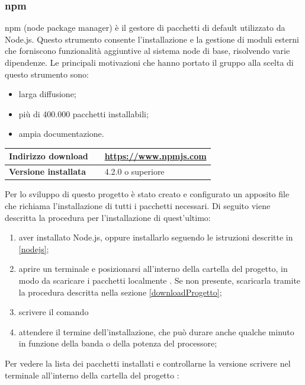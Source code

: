 		\subsubsection{npm} \label{npm}
		npm (node package manager) è il gestore di pacchetti di default utilizzato da Node.js. Questo strumento consente  l'installazione e la gestione di moduli esterni che forniscono funzionalità aggiuntive al sistema node di base, risolvendo varie dipendenze.
		Le principali motivazioni che hanno portato il gruppo alla scelta di questo strumento sono:
		\begin{itemize}
			\item larga diffusione;
			\item più di 400.000 pacchetti installabili;
			\item ampia documentazione.
		\end{itemize}
		\begin{table}[H]
			\centering
			\begin{tabular}{p{2cm}p{0.5cm}p{11.5cm}}
				\arrayrulecolor{lightgray}
				\toprule
				\textbf{Indirizzo download} & &
				\url{https://www.npmjs.com}
				\\ \midrule
				\textbf{Versione installata} & &
				4.2.0 o superiore
				\\ \bottomrule
			\end{tabular}
		\end{table}
		Per lo sviluppo di questo progetto è stato creato e configurato un apposito file che richiama l'installazione di tutti i pacchetti necessari. Di seguito viene descritta la procedura per l'installazione di quest'ultimo:
		\begin{enumerate}
			\item aver installato Node.js, oppure installarlo seguendo le istruzioni descritte in \ref{nodejs};
			\item aprire un terminale e posizionarsi all'interno della cartella del progetto, in modo da scaricare i pacchetti localmente . Se non presente, scaricarla tramite la procedura descritta nella sezione \ref{downloadProgetto};
			\item scrivere il comando 
			\begin{center}
				 \label{npminstall}
			\end{center}
			\item attendere il termine dell'installazione, che può durare anche qualche minuto in funzione della banda o della potenza del processore;
		\end{enumerate}
		Per vedere la lista dei pacchetti installati e controllarne la versione scrivere nel terminale all'interno della cartella del progetto \progetto:
		\begin{center}
		\end{center}
